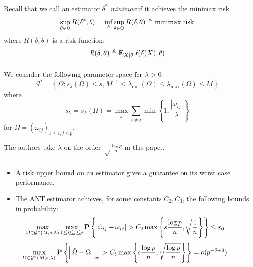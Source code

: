 \begin{frame}[fragile] \frametitle{}

    \vspace{0.5cm}
    Recall that we call an estimator $\delta^*$ \textit{minimax} if it achieves
    the minimax risk:
    $$
    \sup_{\theta\in\Theta} R(\delta^*, \theta)
    =  \inf_\delta \sup_{\theta\in\Theta} R(\delta, \theta)
    \triangleq \text{minimax risk}
    $$
    where $R(\delta, \theta)$ is a risk function:
    $$
    R(\delta, \theta) \triangleq \mathbf{E}_{X|\theta}\; \ell(\delta(X), \theta)
    $$
\end{frame}
\begin{frame}[fragile] \frametitle{}
    \vspace{0.5cm}

    We consider the following parameter space for $\lambda > 0$:
    $$
    \mathcal{G}^* = \left\{
    \Omega: s_\lambda(\Omega) \leq s, M^{-1}
        \leq \lambda_\mathrm{min}(\Omega)
        \leq \lambda_\mathrm{max}(\Omega)
        \leq M
    \right\}
    $$
    where
    $$
    s_\lambda = s_\lambda(\Omega) = \max_j\sum_{i\neq j}
    \min\left\{1, \frac{|\omega_{ij}|}{\lambda}\right\}
    $$
    for $\Omega = (\omega_{ij})_{1\leq i, j\leq p}$.

    The authors take $\lambda$ on the order $\sqrt\frac{\log p}{n}$ in this
    paper.

\end{frame}
\begin{frame}[fragile] \frametitle{}

    \begin{itemize}
        \item A risk upper bound on an estimator gives a guarantee on its
            worst case performance.
        \item The ANT estimator achieves, for some constants $C_2, C_3$,
            the following bounds in probability:
            \begin{align*}
                \hspace{-0.8cm}
            \max_{\Omega\in\Gg^*(M, s, \lambda)}\max_{1 \leq i \leq j \leq p}
            \PP\left\{
            |\hat\omega_{ij} - \omega_{ij}| > C_2 \max\left\{
            s\frac{\log p}{n}, \sqrt\frac{1}{n}
            \right\}
            \right\} \leq \varepsilon_0
            \end{align*}
            \begin{align*}
                \hspace{-0.8cm}
            \max_{\Omega\in\Gg^*(M, s, \lambda)}
            \PP\left\{
            \norm{\hat\Omega - \Omega}_\infty > C_3 \max\left\{
            s\frac{\log p}{n}, \sqrt\frac{\log p}{n}
            \right\}
            \right\} = o(p^{-\delta + 3})
            \end{align*}
    \end{itemize}
\end{frame}
